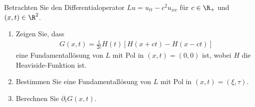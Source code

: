 
\begin{exercise}

Betrachten Sie den Differentialoperator $Lu = u_{tt} - c^2u_{xx}$ für $c \in \R_+$
und $(x,t) \in \R^2$.
\begin{enumerate}[label = (\roman*)]
  \item Zeigen Sie, dass
  \begin{align*}
    G(x,t) = \frac{1}{2c}H(t)[H(x+ct) - H(x-ct)]
  \end{align*}
  eine Fundamentallösung von $L$ mit Pol in $(x,t) = (0,0)$ ist, wobei $H$
  die Heaviside-Funktion ist.
  \item Bestimmen Sie eine Fundamentallösung von $L$ mit Pol in $(x,t) = (\xi,\tau)$.
  \item Berechnen Sie $\partial_tG(x,t)$.
\end{enumerate}
\end{exercise}


